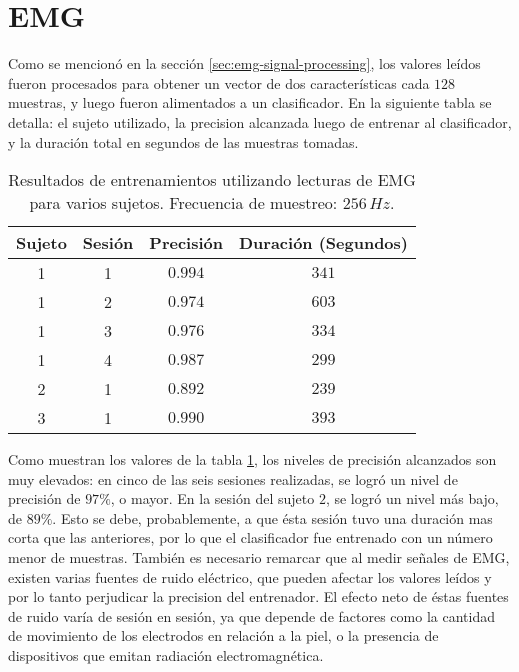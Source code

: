 \section{EMG}

Como se mencionó en la sección \ref{sec:emg-signal-processing}, los valores leídos fueron procesados para obtener un vector de dos características cada $128$ muestras, y luego fueron alimentados a un clasificador. En la siguiente tabla se detalla: el sujeto utilizado, la precision alcanzada luego de entrenar al clasificador, y la duración total en segundos de las muestras tomadas.

\begin{table}[H]
\centering
\begin{tabular}{ |c|c|c|c| } 
 \hline
 Sujeto & Sesión & Precisión & Duración (Segundos) \\ 
 \hline
 1 & 1 & $0.994$ & $341$ \\
 \hline
 1 & 2 & $0.974$ & $603$ \\
 \hline
 1 & 3 & $0.976$ & $334$ \\
 \hline
 1 & 4 & $0.987$ & $299$ \\
  \hline
 2 & 1 & $0.892$ & $239$ \\
  \hline
 3 & 1 & $0.990$ & $393$ \\

 \hline
\end{tabular}
\caption{Resultados de entrenamientos utilizando lecturas de EMG para varios sujetos. Frecuencia de muestreo: $256\,Hz$.}
\label{tab:emg-results}
\end{table}

Como muestran los valores de la tabla \ref{tab:emg-results}, los niveles de precisión alcanzados son muy elevados: en cinco de las seis sesiones realizadas, se logró un nivel de precisión de $97\%$, o mayor.  En la sesión del sujeto $2$, se logró un nivel más bajo, de $89\%$. Esto se debe, probablemente, a que ésta sesión tuvo una duración mas corta que las anteriores, por lo que el clasificador fue entrenado con un número menor de muestras. También es necesario remarcar que al medir señales de EMG, existen varias fuentes de ruido eléctrico, que pueden afectar los valores leídos y por lo tanto perjudicar la precision del entrenador. El efecto neto de éstas fuentes de ruido varía de sesión en sesión, ya que depende de factores como la cantidad de movimiento de los electrodos en relación a la piel, o la presencia de dispositivos que emitan radiación electromagnética\cite{emg-delsys}.

